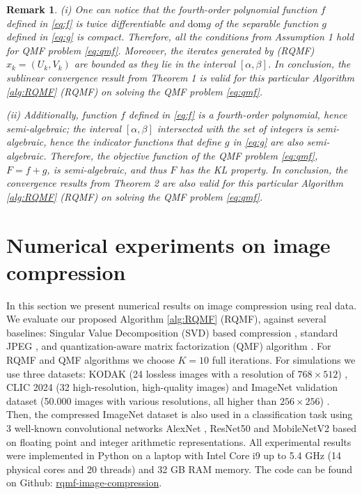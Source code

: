\documentclass[lettersize,journal]{IEEEtran}
\newtheorem{remark}{Remark}
\begin{document}
\begin{remark}
(i) One can notice that the fourth-order polynomial function $f$ defined in \eqref{eq:f} is twice differentiable and $\text{dom} g$ of the separable function $g$ defined in \eqref{eq:g} is compact. Therefore,  all the conditions from Assumption 1 hold for QMF problem \eqref{eq:qmf}. Moreover,  the iterates generated by (RQMF) $x_k=(U_k, V_k)$ are bounded as they lie in the interval $[\alpha,\beta]$. In conclusion, the sublinear  convergence result from Theorem 1 is valid for this particular Algorithm \ref{alg:RQMF} (RQMF) on solving the QMF problem \eqref{eq:qmf}.

\vspace{0.15cm}

\noindent (ii) Additionally, function $f$ defined in \eqref{eq:f} is a fourth-order polynomial, hence semi-algebraic;  the interval $[\alpha,\beta]$ intersected with the set of integers is semi-algebraic, hence  the indicator functions that define  $g$ in \eqref{eq:g} are also semi-algebraic. Therefore, the objective function of the QMF problem \eqref{eq:qmf},   $F=f+g$,  is semi-algebraic, and thus $F$ has the KL property.  In conclusion, the convergence results from Theorem 2 are also valid for this particular Algorithm \ref{alg:RQMF} (RQMF) on solving the QMF problem \eqref{eq:qmf}.  
\end{remark}


 


\section{Numerical experiments on image compression}
\noindent In this section we present numerical results on image compression using real data. We evaluate our proposed Algorithm \ref{alg:RQMF} (RQMF), against several baselines: Singular Value Decomposition (SVD) based compression \cite{golpayegani2024patchsvd}, standard JPEG \cite{wallace1991jpeg},   and quantization-aware matrix factorization (QMF) algorithm \cite{qmf}. For RQMF and QMF algorithms we choose $K=10$ full iterations. For simulations we use three datasets: KODAK (24 lossless images with a resolution of $768\times 512$) \cite{kodak1993}, CLIC 2024 (32 high-resolution, high-quality images) \cite{clic2024} and ImageNet validation dataset (50.000 images with various resolutions, all higher than $256 \times 256$) \cite{deng2009imagenet}. Then,  the compressed ImageNet dataset is also used  in a classification task using 3 well-known convolutional networks AlexNet \cite{alexnet}, ResNet50 \cite{resnet} and MobileNetV2 \cite{mobilenetv2} based on floating point and integer arithmetic representations.  All experimental results were implemented in Python on  a laptop with Intel Core i9 up to 5.4 GHz (14 physical cores and 20 threads) and  32 GB RAM memory.   The code can be found on Github:  \href{https://github.com/tibi-coder/rqmf-image-compression}{rqmf-image-compression}.
\end{document}
